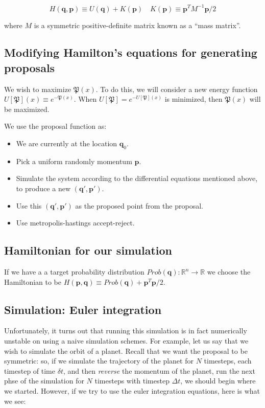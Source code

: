 \documentclass[titlepage]{article}
\newcommand{\R}{\mathbb{R}}
\newcommand{\p}{\mathbf{p}}
\newcommand{\q}{\mathbf{q}}
\renewcommand{\P}{\mathfrak{P}}
\begin{document}
$$ H(\q, \p) \equiv  U(\q) + K(\p) \quad K(\p) \equiv \p^T M^{-1} \p/2 $$

where $M$ is a symmetric positive-definite matrix known as a ``mass matrix''.


\subsection{Modifying Hamilton's equations for generating proposals}

We wish to maximize $\P(x)$. To do this, we will consider a new energy 
function $U[\P](x) \equiv e^{-\P(x)}$. When $U[\P] = e^{-U[\P](x)}$
is minimized, then $\P(x)$ will be maximized.

We use the proposal function as:
\begin{itemize}
    \item We are currently at the location $\q_0$.
    \item Pick a uniform randomly momentum $\p$.
    \item Simulate the system according to the differential equations mentioned
        above, to produce a new $(\q', \p')$.
    \item Use this $(\q', \p')$ as the proposed point from the proposal.
    \item Use metropolis-hastings accept-reject.
\end{itemize}




\subsection{Hamiltonian for our simulation}
If we have a a target probability distribution $Prob(\q): \R^n \rightarrow \R$
we choose the Hamiltonian to be $H(\p, \q) \equiv Prob(\q) + \p^T \p/2$.


\subsection{Simulation: Euler integration}
Unfortunately, it turns out that running this simulation is in fact numerically
unstable on using a naive simulation schemes. For example, let us say
that we wish to simulate the orbit of a planet. Recall that we want
the proposal to be symmetric: so, if we simulate the trajectory of the planet
for $N$ timesteps, each timestep of time $\delta t$, and then \emph{reverse}
the momentum of the planet, run the next phse of the simulation for $N$ timesteps
with timestep $\Delta t$, we should begin where we started. However,
if we try to use the euler integration equations, here is what we see:
\end{document}

